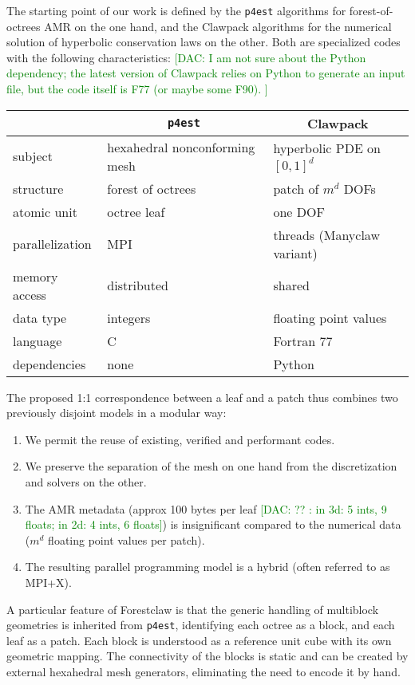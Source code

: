 \documentclass{IOS-Book-Article}     %
\newcommand{\comment}[1]{\textcolor{green}{[DAC: #1]}\xspace}
\newcommand{\forestclaw}{Forestclaw\xspace}
\newcommand{\pforest}{\texttt{p4est}\xspace}
\begin{document}
The starting point of our work is defined by the \pforest algorithms for
forest-of-octrees AMR on the one hand, and the Clawpack algorithms for the
numerical solution of hyperbolic conservation laws
on the other.  Both are specialized codes with the following characteristics:
\comment{I am not sure about the Python dependency;  the latest version of Clawpack relies on
Python to generate an input file, but the code itself is F77 (or maybe some F90). }
\begin{center}
\begin{tabular}{l|l|l}
& \multicolumn{1}{c|}{\pforest} & \multicolumn{1}{c}{Clawpack} \\
\hline
subject & hexahedral nonconforming mesh &  hyperbolic PDE on $[0, 1]^d$ \\
structure & forest of octrees & patch of $m^d$ DOFs \\
atomic unit & octree leaf & one DOF \\
parallelization & MPI & threads (Manyclaw variant) \\
memory access & distributed & shared \\
data type & integers & floating point values \\
language & C & Fortran 77 \\
dependencies & none & Python \\
\end{tabular}
\end{center}
The proposed 1:1 correspondence between a leaf and a patch thus combines two
previously disjoint models in a modular way:
\begin{enumerate}
\item We permit the reuse of existing, verified and performant codes.
\item We preserve the separation of the mesh on one hand from the
discretization and solvers on the other.
\item The AMR metadata (approx 100 bytes per leaf
\comment{?? : in 3d: 5 ints,  9 floats; in 2d: 4 ints, 6 floats}) is insignificant compared to
the numerical data ($m^d$ floating point values per patch).
\item The resulting parallel programming model is a hybrid (often referred
to as MPI+X).
\end{enumerate}

A particular feature of \forestclaw is that the generic handling of multiblock
geometries is inherited from \pforest, identifying each octree as a block, and
each leaf as a patch.  Each block is understood as a reference unit cube with
its own geometric mapping.  The connectivity of the blocks is static and can be
created by external hexahedral mesh generators, eliminating the need to encode
it by hand.
\end{document}
